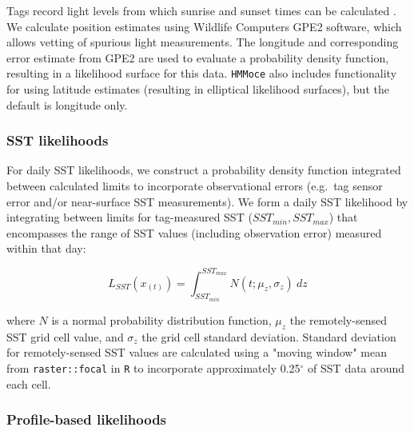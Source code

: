 Tags record light levels from which sunrise and sunset times can be
calculated \citep{Hill2001}. We calculate position estimates using
Wildlife Computers GPE2 software, which allows vetting of spurious light
measurements. The longitude and corresponding error estimate from GPE2
are used to evaluate a probability density function, resulting in a
likelihood surface for this data. \texttt{HMMoce} also includes
functionality for using latitude estimates (resulting in elliptical
likelihood surfaces), but the default is longitude only.

\subsubsection{SST likelihoods}

For daily SST likelihoods, we construct a probability density function
integrated between calculated limits \citep{LeBris2013a} to incorporate
observational errors (e.g.~tag sensor error and/or near-surface SST
measurements). We form a daily SST likelihood by integrating between
limits for tag-measured SST ($SST_{min},SST_{max}$) that encompasses
the range of SST values (including observation error) measured within
that day:

\begin{equation}
L_{SST}(x_{(t)}) = \int_{SST_{min}}^{SST_{max}} N(t; \mu_z, \sigma_z)~dz
\label{eq:a1e2}
\end{equation}

where $N$ is a normal probability distribution function, $\mu_z$ the
remotely-sensed SST grid cell value, and $\sigma_z$ the grid cell
standard deviation. Standard deviation for remotely-sensed SST values
are calculated using a "moving window" mean from
\texttt{raster::focal} in \texttt{R} to incorporate approximately 0.25$^{\circ}$
of SST data around each cell.

\subsubsection{Profile-based
likelihoods}

